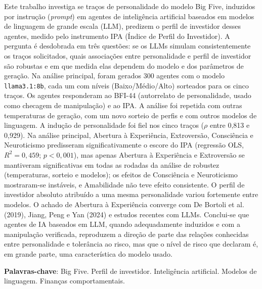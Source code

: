     Este trabalho investiga se traços de personalidade do modelo Big Five,
    induzidos por instrução (\textit{prompt}) em agentes de inteligência
    artificial baseados em modelos de linguagem de grande escala (LLM),
    predizem o perfil de investidor desses agentes, medido pelo instrumento
    IPA (Índice de Perfil do Investidor). A pergunta é desdobrada em três
    questões: se os LLMs simulam consistentemente os traços solicitados,
    quais associações entre personalidade e perfil de investidor são
    robustas e em que medida elas dependem do modelo e dos parâmetros de
    geração. Na análise principal, foram gerados 300 agentes com o modelo
    \texttt{llama3.1:8b}, cada um com níveis (Baixo/Médio/Alto) sorteados
    para os cinco traços. Os agentes responderam ao BFI-44 (autorrelato de
    personalidade, usado como checagem de manipulação) e ao IPA. A análise
    foi repetida com outras temperaturas de geração, com um novo sorteio de
    perfis e com outros modelos de linguagem. A indução de personalidade foi
    fiel nos cinco traços ($\rho$ entre 0,813 e 0,929). Na análise
    principal, Abertura à Experiência, Extroversão, Consciência e
    Neuroticismo predisseram significativamente o escore do IPA (regressão
    OLS, $R^2=0{,}459$; $p<0{,}001$), mas apenas Abertura à Experiência e
    Extroversão se mantiveram significativas em todas as rodadas da análise
    de robustez (temperaturas, sorteio e modelos); os efeitos de Consciência e
    Neuroticismo mostraram-se instáveis, e Amabilidade não teve efeito
    consistente. O perfil de investidor absoluto atribuído a uma mesma
    personalidade variou fortemente entre modelos. O achado de Abertura à
    Experiência converge com De Bortoli et al. (2019), Jiang, Peng e Yan
    (2024) e estudos recentes com LLMs. Conclui-se que agentes de IA
    baseados em LLM, quando adequadamente induzidos e com a manipulação
    verificada, reproduzem a direção de parte das relações conhecidas entre
    personalidade e tolerância ao risco, mas que o nível de risco que
    declaram é, em grande parte, uma característica do modelo usado.

    \vspace{\baselineskip}

    \noindent
    \textbf{Palavras-chave}: Big Five. Perfil de investidor. Inteligência
    artificial. Modelos de linguagem. Finanças comportamentais.
